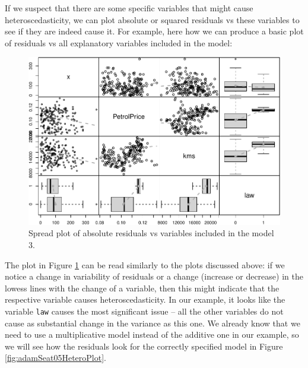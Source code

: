 \documentclass[]{book}
\newenvironment{Shaded}{\begin{snugshade}}{\end{snugshade}}
\newcommand{\DataTypeTok}[1]{\textcolor[rgb]{0.13,0.29,0.53}{#1}}
\newcommand{\DecValTok}[1]{\textcolor[rgb]{0.00,0.00,0.81}{#1}}
\newcommand{\KeywordTok}[1]{\textcolor[rgb]{0.13,0.29,0.53}{\textbf{#1}}}
\newcommand{\NormalTok}[1]{#1}
\newcommand{\OperatorTok}[1]{\textcolor[rgb]{0.81,0.36,0.00}{\textbf{#1}}}
\newcommand{\OtherTok}[1]{\textcolor[rgb]{0.56,0.35,0.01}{#1}}
\theoremstyle{definition}
\theoremstyle{definition}
\theoremstyle{definition}
\theoremstyle{definition}
\theoremstyle{remark}
\begin{document}
If we suspect that there are some specific variables that might cause heteroscedasticity, we can plot absolute or squared residuals vs these variables to see if they are indeed cause it. For example, here how we can produce a basic plot of residuals vs all explanatory variables included in the model:

\begin{Shaded}
\end{Shaded}

\begin{figure}
\centering
\includegraphics{Svetunkov--2022----ADAM_files/figure-latex/adamSeat03Spread-1.pdf}
\caption{\label{fig:adamSeat03Spread}Spread plot of absolute residuals vs variables included in the model 3.}
\end{figure}

The plot in Figure \ref{fig:adamSeat03Spread} can be read similarly to the plots discussed above: if we notice a change in variability of residuals or a change (increase or decrease) in the lowess lines with the change of a variable, then this might indicate that the respective variable causes heteroscedasticity. In our example, it looks like the variable \texttt{law} causes the most significant issue -- all the other variables do not cause as substantial change in the variance as this one. We already know that we need to use a multiplicative model instead of the additive one in our example, so we will see how the residuals look for the correctly specified model in Figure \ref{fig:adamSeat05HeteroPlot}.
\end{document}

